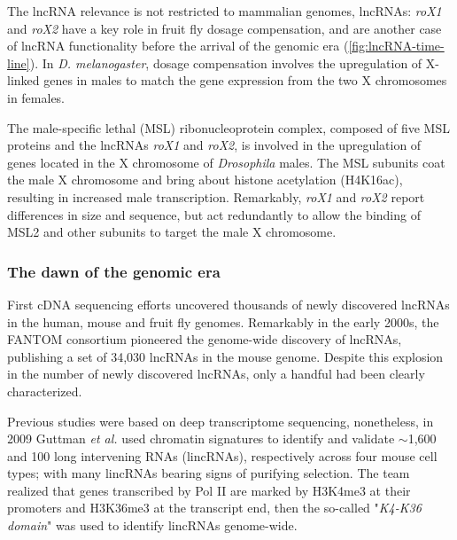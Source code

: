 The lncRNA relevance is not restricted to mammalian genomes, lncRNAs: \textit{roX1} and \textit{roX2} have a key role in fruit fly dosage compensation, and are another case of lncRNA functionality before the arrival of the genomic era (\autoref{fig:lncRNA-time-line}). In \textit{D. melanogaster}, dosage compensation involves the upregulation of X-linked genes in males to match the gene expression from the two X chromosomes in females.\autocite{kim_2018_rox}

The male-specific lethal (MSL) ribonucleoprotein complex, composed of five MSL proteins and the lncRNAs \textit{roX1} and \textit{roX2}, is involved in the upregulation of genes located in the X chromosome of \textit{Drosophila} males.\autocite{kim_2018_rox} The MSL subunits coat the male X chromosome and bring about histone acetylation (H4K16ac), resulting in increased male transcription.\autocite{gelbart_2009_drosophila} Remarkably, \textit{roX1} and \textit{roX2} report differences in size and sequence, but act redundantly to allow the binding of MSL2 and other subunits to target the male X chromosome.\autocite{meller_2002_rox}

\subsubsection{The dawn of the genomic era}
\label{subsubsection:dawn_genomic_era}

First cDNA sequencing efforts uncovered thousands of newly discovered lncRNAs in the human, mouse and fruit fly genomes.\autocite{ota_2004_complete_cDNA,carninci_2005_transcriptional,stapleton_2002_drosophila} Remarkably in the early 2000s, the FANTOM consortium pioneered the genome-wide discovery of lncRNAs, publishing a set of 34,030 lncRNAs in the mouse genome.\autocite{carninci_2005_transcriptional} Despite this explosion in the number of newly discovered lncRNAs, only a handful had been clearly characterized.

Previous studies were based on deep transcriptome sequencing, nonetheless, in 2009 Guttman \textit{et al.} used chromatin signatures to identify and validate $\sim$1,600 and 100 long intervening RNAs (lincRNAs), respectively across four mouse cell types; with many lincRNAs bearing signs of purifying selection.\autocite{guttman_2009_chromatin} The team realized that genes transcribed by Pol II are marked by H3K4me3 at their promoters and H3K36me3 at the transcript end, then the so-called "\textit{K4-K36 domain}" was used to identify lincRNAs genome-wide. 

